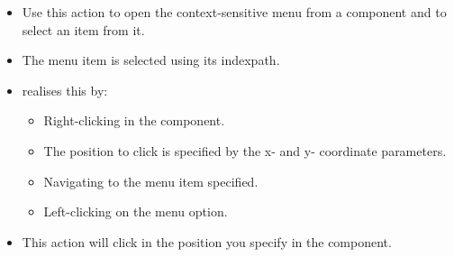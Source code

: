 
\begin{itemize}
\item Use this action to open the context-sensitive menu from a component and to select an item from it.
\item The menu item is selected using its indexpath. 
\item \jb{} realises this by:
\begin{itemize}
\item Right-clicking in the component.
\item The position to click is specified by the x- and y- coordinate parameters.
\item Navigating to the menu item specified.
\item Left-clicking on the menu option.  
\end{itemize}
\item This action will click in the position you specify in the component.

\end{itemize}


